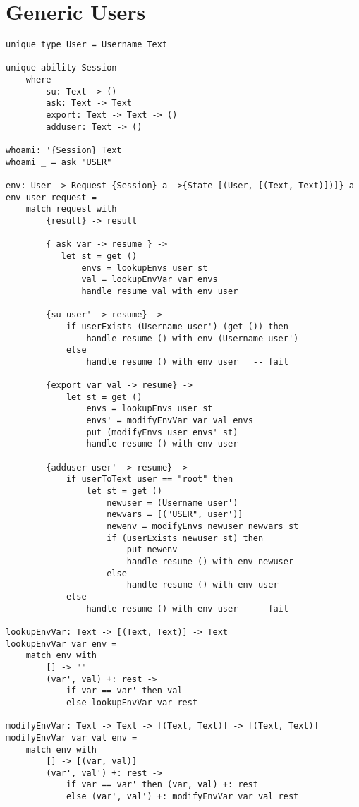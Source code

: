 \documentclass[logo,bsc,singlespacing,parskip]{infthesis}
\begin{document}
\section{Generic Users}

\begin{lstlisting}[language=unison]
unique type User = Username Text

unique ability Session
    where
        su: Text -> ()
        ask: Text -> Text
        export: Text -> Text -> ()
        adduser: Text -> ()

whoami: '{Session} Text
whoami _ = ask "USER"

env: User -> Request {Session} a ->{State [(User, [(Text, Text)])]} a
env user request = 
    match request with
        {result} -> result

        { ask var -> resume } -> 
           let st = get ()
               envs = lookupEnvs user st
               val = lookupEnvVar var envs
               handle resume val with env user

        {su user' -> resume} -> 
            if userExists (Username user') (get ()) then
                handle resume () with env (Username user')
            else 
                handle resume () with env user   -- fail

        {export var val -> resume} -> 
            let st = get ()
                envs = lookupEnvs user st
                envs' = modifyEnvVar var val envs
                put (modifyEnvs user envs' st) 
                handle resume () with env user

        {adduser user' -> resume} ->
            if userToText user == "root" then
                let st = get ()
                    newuser = (Username user')
                    newvars = [("USER", user')]
                    newenv = modifyEnvs newuser newvars st
                    if (userExists newuser st) then
                        put newenv
                        handle resume () with env newuser
                    else 
                        handle resume () with env user
            else 
                handle resume () with env user   -- fail

lookupEnvVar: Text -> [(Text, Text)] -> Text
lookupEnvVar var env =
    match env with
        [] -> ""
        (var', val) +: rest ->
            if var == var' then val
            else lookupEnvVar var rest

modifyEnvVar: Text -> Text -> [(Text, Text)] -> [(Text, Text)]
modifyEnvVar var val env =
    match env with
        [] -> [(var, val)]
        (var', val') +: rest ->
            if var == var' then (var, val) +: rest
            else (var', val') +: modifyEnvVar var val rest


\end{lstlisting}
\end{document}
